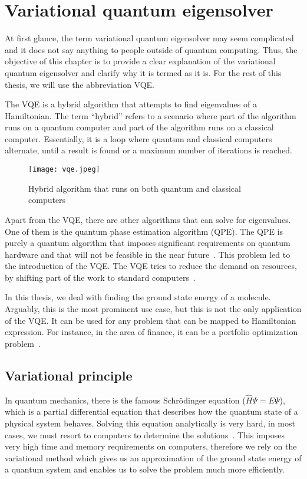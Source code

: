 \chapter{Variational quantum eigensolver}\label{ch:vqe}
At first glance, the term variational quantum eigensolver may seem complicated and it does not say anything to people outside of quantum computing. Thus, the objective of this chapter is to provide a clear explanation of the variational quantum eigensolver and clarify why it is termed as it is. For the rest of this thesis, we will use the abbreviation VQE.

The VQE is a hybrid algorithm that attempts to find eigenvalues of a Hamiltonian. The term ``hybrid'' refers to a scenario where part of the algorithm runs on a quantum computer and part of the algorithm runs on a classical computer. Essentially, it is a loop where quantum and classical computers alternate, until a result is found or a maximum number of iterations is reached.

\begin{figure}[H]
    \centering
    \texttt{[image: vqe.jpeg]}
    \caption{Hybrid algorithm that runs on both quantum and classical computers~\cite{img:hybrid_alg}}
\end{figure}

Apart from the VQE, there are other algorithms that can solve for eigenvalues. One of them is the quantum phase estimation algorithm (QPE). The QPE is purely a quantum algorithm that imposes significant requirements on quantum hardware and that will not be feasible in the near future~\cite{nisq}. This problem led to the introduction of the VQE. The VQE tries to reduce the demand on resources, by shifting part of the work to standard computers~\cite{vqe_method}.

In this thesis, we deal with finding the ground state energy of a molecule. Arguably, this is the most prominent use case, but this is not the only application of the VQE. It can be used for any problem that can be mapped to Hamiltonian expression. For instance, in the area of finance, it can be a portfolio optimization problem~\cite{portfolio}.

\section{Variational principle}
In quantum mechanics, there is the famous Schrödinger equation ($\hat{H} \Psi = E \Psi$), which is a partial differential equation that describes how the quantum state of a physical system behaves. Solving this equation analytically is very hard, in most cases, we must resort to computers to determine the solutions~\cite{variational}. This imposes very high time and memory requirements on computers, therefore we rely on the variational method which gives us an approximation of the ground state energy of a quantum system and enables us to solve the problem much more efficiently.

